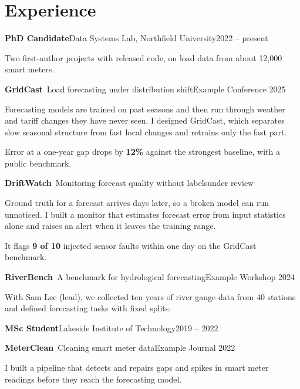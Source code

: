 \documentclass[a4paper,10pt]{article}
\makeatletter
\newcommand{\sep}{\unskip\nobreak\hspace{0.45em}\textcolor{Muted}{\textperiodcentered}\hspace{0.45em}\ignorespaces}
\newcommand{\muted}[1]{\textcolor{Muted}{#1}}
\newcommand{\project}[3]{\par\Needspace{6\baselineskip}\if@nobreak\else\vspace{5pt}\fi\textbf{#1}\ \muted{#2}\hfill\muted{\small #3}\par\nopagebreak\vspace{1pt}}
\makeatother
\begin{document}
\section{Experience}
{\color{Accent}\bfseries PhD Candidate}\sep Data Systems Lab, Northfield University\hfill\muted{\small 2022 -- present}\par\nopagebreak
\vspace{1pt}
Two first-author projects with released code, on load data from about 12,000 smart meters.\par\nopagebreak

\project{GridCast}{Load forecasting under distribution shift}{Example Conference 2025}
\begin{tightitem}
  \item Forecasting models are trained on past seasons and then run through weather and tariff changes they have never seen. I designed GridCast, which separates slow seasonal structure from fast local changes and retrains only the fast part.
  \item Error at a one-year gap drops by \textbf{12\%} against the strongest baseline, with a public benchmark.
\end{tightitem}

\project{DriftWatch}{Monitoring forecast quality without labels}{under review}
\begin{tightitem}
  \item Ground truth for a forecast arrives days later, so a broken model can run unnoticed. I built a monitor that estimates forecast error from input statistics alone and raises an alert when it leaves the training range.
  \item It flags \textbf{9 of 10} injected sensor faults within one day on the GridCast benchmark.
\end{tightitem}

\project{RiverBench}{A benchmark for hydrological forecasting}{Example Workshop 2024}
\begin{tightitem}
  \item With Sam Lee (lead), we collected ten years of river gauge data from 40 stations and defined forecasting tasks with fixed splits.
\end{tightitem}

\par{}\vspace{8pt}
{\color{Accent}\bfseries MSc Student}\sep Lakeside Institute of Technology\hfill\muted{\small 2019 -- 2022}\par\nopagebreak
\project{MeterClean}{Cleaning smart meter data}{Example Journal 2022}
\begin{tightitem}
  \item I built a pipeline that detects and repairs gaps and spikes in smart meter readings before they reach the forecasting model.
\end{tightitem}
\end{document}
